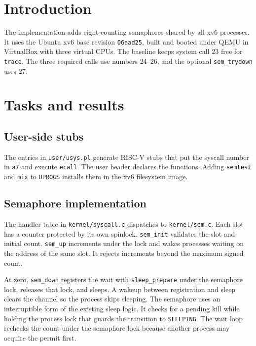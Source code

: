 \chapter{Introduction}

The implementation adds eight counting semaphores shared by all xv6 processes. It uses the Ubuntu xv6 base revision \texttt{06aad25}, built and booted under QEMU in VirtualBox with three virtual CPUs. The baseline keeps system call 23 free for \texttt{trace}. The three required calls use numbers 24--26, and the optional \texttt{sem\_trydown} uses 27.

\chapter{Tasks and results}

\section{User-side stubs}

The entries in \texttt{user/usys.pl} generate RISC-V stubs that put the syscall number in \texttt{a7} and execute \texttt{ecall}. The user header declares the functions. Adding \texttt{semtest} and \texttt{mix} to \texttt{UPROGS} installs them in the xv6 filesystem image.


\clearpage
\section{Semaphore implementation}

The handler table in \texttt{kernel/syscall.c} dispatches to \texttt{kernel/sem.c}. Each slot has a counter protected by its own spinlock. \texttt{sem\_init} validates the slot and initial count. \texttt{sem\_up} increments under the lock and wakes processes waiting on the address of the same slot. It rejects increments beyond the maximum signed count.

At zero, \texttt{sem\_down} registers the wait with \texttt{sleep\_prepare} under the semaphore lock, releases that lock, and sleeps. A wakeup between registration and sleep clears the channel so the process skips sleeping. The semaphore uses an interruptible form of the existing sleep logic. It checks for a pending kill while holding the process lock that guards the transition to \texttt{SLEEPING}. The wait loop rechecks the count under the semaphore lock because another process may acquire the permit first.

